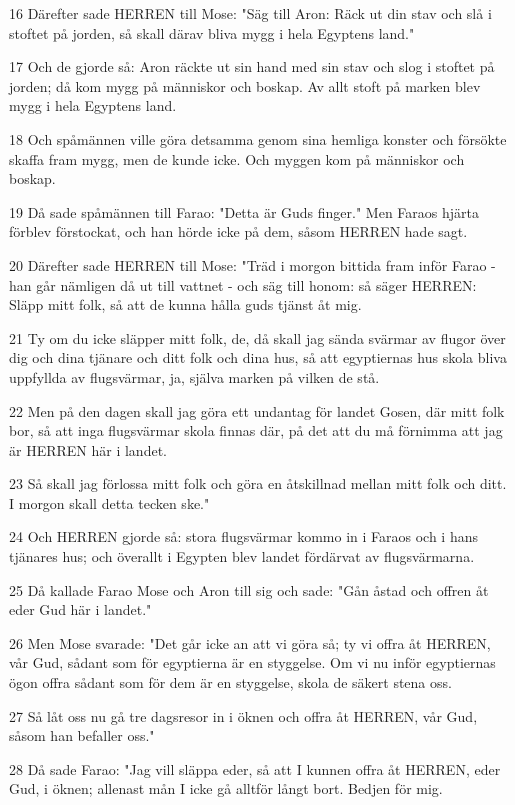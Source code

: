 \par 16 Därefter sade HERREN till Mose: "Säg till Aron: Räck ut din stav och slå i stoftet på jorden, så skall därav bliva mygg i hela Egyptens land."
\par 17 Och de gjorde så: Aron räckte ut sin hand med sin stav och slog i stoftet på jorden; då kom mygg på människor och boskap. Av allt stoft på marken blev mygg i hela Egyptens land.
\par 18 Och spåmännen ville göra detsamma genom sina hemliga konster och försökte skaffa fram mygg, men de kunde icke. Och myggen kom på människor och boskap.
\par 19 Då sade spåmännen till Farao: "Detta är Guds finger." Men Faraos hjärta förblev förstockat, och han hörde icke på dem, såsom HERREN hade sagt.
\par 20 Därefter sade HERREN till Mose: "Träd i morgon bittida fram inför Farao - han går nämligen då ut till vattnet - och säg till honom: så säger HERREN: Släpp mitt folk, så att de kunna hålla guds tjänst åt mig.
\par 21 Ty om du icke släpper mitt folk, de, då skall jag sända svärmar av flugor över dig och dina tjänare och ditt folk och dina hus, så att egyptiernas hus skola bliva uppfyllda av flugsvärmar, ja, själva marken på vilken de stå.
\par 22 Men på den dagen skall jag göra ett undantag för landet Gosen, där mitt folk bor, så att inga flugsvärmar skola finnas där, på det att du må förnimma att jag är HERREN här i landet.
\par 23 Så skall jag förlossa mitt folk och göra en åtskillnad mellan mitt folk och ditt. I morgon skall detta tecken ske."
\par 24 Och HERREN gjorde så: stora flugsvärmar kommo in i Faraos och i hans tjänares hus; och överallt i Egypten blev landet fördärvat av flugsvärmarna.
\par 25 Då kallade Farao Mose och Aron till sig och sade: "Gån åstad och offren åt eder Gud här i landet."
\par 26 Men Mose svarade: "Det går icke an att vi göra så; ty vi offra åt HERREN, vår Gud, sådant som för egyptierna är en styggelse. Om vi nu inför egyptiernas ögon offra sådant som för dem är en styggelse, skola de säkert stena oss.
\par 27 Så låt oss nu gå tre dagsresor in i öknen och offra åt HERREN, vår Gud, såsom han befaller oss."
\par 28 Då sade Farao: "Jag vill släppa eder, så att I kunnen offra åt HERREN, eder Gud, i öknen; allenast mån I icke gå alltför långt bort. Bedjen för mig.
